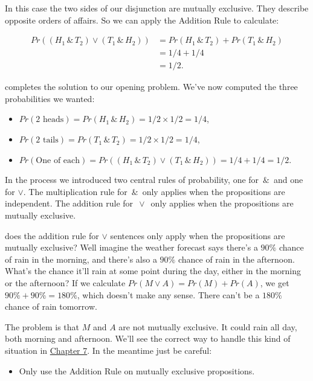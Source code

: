 \documentclass[justified]{tufte-book}
\providecommand{\tightlist}{%
  \setlength{\itemsep}{0pt}\setlength{\parskip}{0pt}}
\newenvironment{warning}{\begin{itemize}\item[\faBan]}{\end{itemize}}
\theoremstyle{definition}
\theoremstyle{definition}
\theoremstyle{definition}
\theoremstyle{remark}
\begin{document}
In this case the two sides of our disjunction are mutually exclusive. They describe opposite orders of affairs. So we can apply the Addition Rule to calculate:

\[
  \begin{aligned}
    Pr((H_1 \,\&\, T_2) \vee (T_1 \,\&\, H_2)) 
      &= Pr(H_1 \,\&\, T_2) + Pr(T_1 \,\&\, H_2)\\
      &= 1/4 + 1/4\\
      &= 1/2.
  \end{aligned}      
\]

 completes the solution to our opening problem. We've now computed the three probabilities we wanted:

\begin{itemize}
\tightlist
\item
  \(Pr(\mbox{2 heads}) = Pr(H_1 \,\&\, H_2) = 1/2 \times 1/2 = 1/4\),
\item
  \(Pr(\mbox{2 tails}) = Pr(T_1 \,\&\, T_2) = 1/2 \times 1/2 = 1/4\),
\item
  \(Pr(\mbox{One of each}) = Pr((H_1 \,\&\, T_2) \vee (T_1 \,\&\, H_2)) = 1/4 + 1/4 = 1/2\).
\end{itemize}

In the process we introduced two central rules of probability, one for \(\,\&\,\) and one for \(\vee\). The multiplication rule for \(\,\&\,\) only applies when the propositions are independent. The addition rule for \(\,\vee\,\) only applies when the propositions are mutually exclusive.

 does the addition rule for \(\vee\) sentences only apply when the propositions are mutually exclusive? Well imagine the weather forecast says there's a \(90\%\) chance of rain in the morning, and there's also a \(90\%\) chance of rain in the afternoon. What's the chance it'll rain at some point during the day, either in the morning or the afternoon? If we calculate \(Pr(M \vee A) = Pr(M) + Pr(A)\), we get \(90\% + 90\% = 180\%\), which doesn't make any sense. There can't be a \(180\%\) chance of rain tomorrow.

The problem is that \(M\) and \(A\) are not mutually exclusive. It could rain all day, both morning and afternoon. We'll see the correct way to handle this kind of situation in \protect\hyperlink{calculating-probabilities-part-ii}{Chapter 7}. In the meantime just be careful:

\begin{warning}
Only use the Addition Rule on mutually exclusive propositions.
\end{warning}
\end{document}
